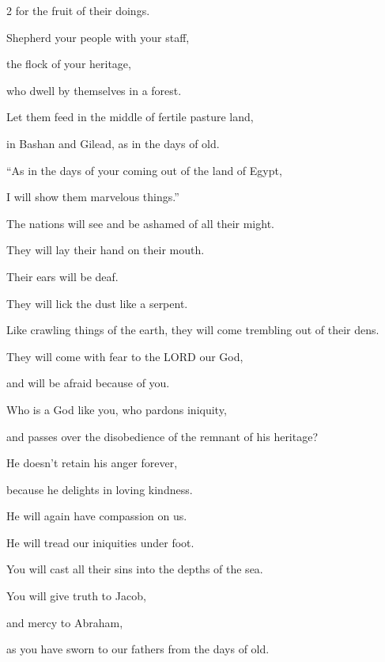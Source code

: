 \begin{multicols}{2}
for the fruit of their doings.

\myverse{}Shepherd your people with your staff,

the flock of your heritage,

who dwell by themselves in a forest.

Let them feed in the middle of fertile pasture land,

in Bashan and Gilead, as in the days of old.

\myverse{}“As in the days of your coming out of the land of Egypt,

I will show them marvelous things.”

\myverse{}The nations will see and be ashamed of all their might.

They will lay their hand on their mouth.

Their ears will be deaf.

\myverse{}They will lick the dust like a serpent.

Like crawling things of the earth, they will come trembling out of their dens.

They will come with fear to the LORD our God,

and will be afraid because of you.

\myverse{}Who is a God like you, who pardons iniquity,

and passes over the disobedience of the remnant of his heritage?

He doesn’t retain his anger forever,

because he delights in loving kindness.

\myverse{}He will again have compassion on us.

He will tread our iniquities under foot.

You will cast all their sins into the depths of the sea.

\myverse{}You will give truth to Jacob,

and mercy to Abraham,

as you have sworn to our fathers from the days of old.
\end{multicols}
